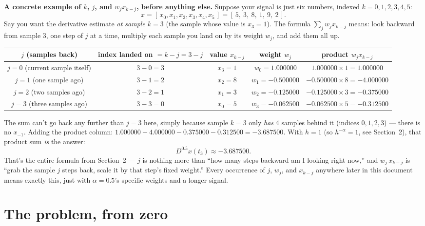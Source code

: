 \documentclass[11pt]{article}
\begin{document}
\begin{cbox}
\textbf{A concrete example of $k$, $j$, and $w_j x_{k-j}$, before anything else.} Suppose your signal is just six numbers, indexed $k=0,1,2,3,4,5$:
\[
x = [\,x_0,x_1,x_2,x_3,x_4,x_5\,] = [\,5,\ 3,\ 8,\ 1,\ 9,\ 2\,].
\]
Say you want the derivative estimate \emph{at sample $k=3$} (the sample whose value is $x_3=1$). The formula $\sum_j w_j x_{k-j}$ means: look backward from sample $3$, one step of $j$ at a time, multiply each sample you land on by its weight $w_j$, and add them all up.

\begin{center}
\small
\begin{tabular}{c c c c c}
\toprule
$j$ (samples back) & index landed on $=k-j=3-j$ & value $x_{k-j}$ & weight $w_j$ & product $w_j x_{k-j}$ \\
\midrule
$j=0$ (current sample itself) & $3-0=3$ & $x_3=1$ & $w_0=1.000000$ & $1.000000\times1=1.000000$ \\
$j=1$ (one sample ago) & $3-1=2$ & $x_2=8$ & $w_1=-0.500000$ & $-0.500000\times8=-4.000000$ \\
$j=2$ (two samples ago) & $3-2=1$ & $x_1=3$ & $w_2=-0.125000$ & $-0.125000\times3=-0.375000$ \\
$j=3$ (three samples ago) & $3-3=0$ & $x_0=5$ & $w_3=-0.062500$ & $-0.062500\times5=-0.312500$ \\
\bottomrule
\end{tabular}
\end{center}

The sum can't go back any further than $j=3$ here, simply because sample $k=3$ only \emph{has} 4 samples behind it (indices $0,1,2,3$) --- there is no $x_{-1}$. Adding the product column: $1.000000-4.000000-0.375000-0.312500=-3.687500$. With $h=1$ (so $h^{-\alpha}=1$, see Section~2), that product sum \emph{is} the answer:
\[
D^{0.5}x(t_3) \approx -3.687500.
\]
That's the entire formula from Section~2 --- $j$ is nothing more than ``how many steps backward am I looking right now,'' and $w_j\,x_{k-j}$ is ``grab the sample $j$ steps back, scale it by that step's fixed weight.'' Every occurrence of $j$, $w_j$, and $x_{k-j}$ anywhere later in this document means exactly this, just with $\alpha=0.5$'s specific weights and a longer signal.
\end{cbox}

\section{The problem, from zero}
\end{document}
